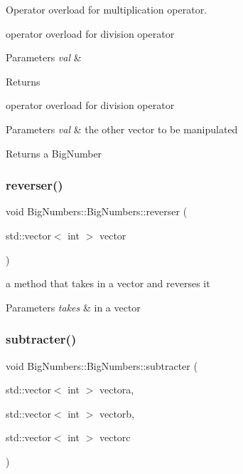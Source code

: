 Operator overload for multiplication operator. 

operator overload for division operator


\begin{DoxyParams}{Parameters}
{\em val} & \\
\hline
\end{DoxyParams}
\begin{DoxyReturn}{Returns}

\end{DoxyReturn}
operator overload for division operator 
\begin{DoxyParams}{Parameters}
{\em val} & the other vector to be manipulated \\
\hline
\end{DoxyParams}
\begin{DoxyReturn}{Returns}
a Big\+Number 
\end{DoxyReturn}
\mbox{\label{class_big_numbers_1_1_big_numbers_af24675c9a4a5ae6c335d9b4c902e02ee}} 
\subsubsection{\texorpdfstring{reverser()}{reverser()}}
{\footnotesize\ttfamily void Big\+Numbers\+::\+Big\+Numbers\+::reverser (\begin{DoxyParamCaption}\item[{std\+::vector$<$ int $>$}]{vector }\end{DoxyParamCaption})}



a method that takes in a vector and reverses it 


\begin{DoxyParams}{Parameters}
{\em takes} & in a vector \\
\hline
\end{DoxyParams}
\mbox{\label{class_big_numbers_1_1_big_numbers_a0a5dfb5ca85f36e40c2c2f068f66d05a}} 
\subsubsection{\texorpdfstring{subtracter()}{subtracter()}}
{\footnotesize\ttfamily void Big\+Numbers\+::\+Big\+Numbers\+::subtracter (\begin{DoxyParamCaption}\item[{std\+::vector$<$ int $>$}]{vectora,  }\item[{std\+::vector$<$ int $>$}]{vectorb,  }\item[{std\+::vector$<$ int $>$}]{vectorc }\end{DoxyParamCaption})}

